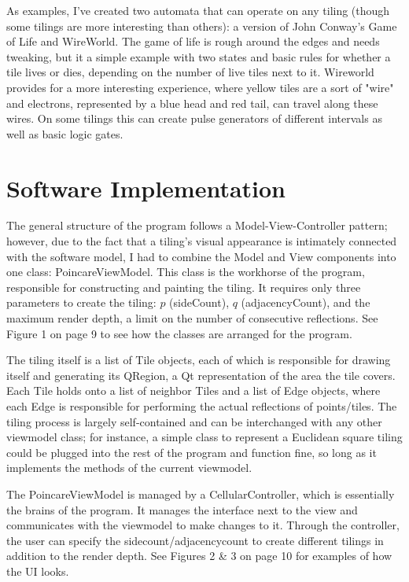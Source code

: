 \documentclass[letterpaper,12pt]{article}
\begin{document}
As examples, I've created two automata that can operate on any tiling (though some tilings are more interesting than others): a version of John Conway's Game of Life and WireWorld. The game of life is rough around the edges and needs tweaking, but it a simple example with two states and basic rules for whether a tile lives or dies, depending on the number of live tiles next to it. Wireworld provides for a more interesting experience, where yellow tiles are a sort of "wire" and electrons, represented by a blue head and red tail, can travel along these wires. On some tilings this can create pulse generators of different intervals as well as basic logic gates.


\section*{Software Implementation}

The general structure of the program follows a Model-View-Controller pattern; however, due to the fact that a tiling's visual appearance is intimately connected with the software model, I had to combine the Model and View components into one class: PoincareViewModel. This class is the workhorse of the program, responsible for constructing and painting the tiling. It requires only three parameters to create the tiling: $p$ (sideCount), $q$ (adjacencyCount), and the maximum render depth, a limit on the number of consecutive reflections. See Figure 1 on page 9 to see how the classes are arranged for the program.

The tiling itself is a list of Tile objects, each of which is responsible for drawing itself and generating its QRegion, a Qt representation of the area the tile covers. Each Tile holds onto a list of neighbor Tiles and a list of Edge objects, where each Edge is responsible for performing the actual reflections of points/tiles. The tiling process is largely self-contained and can be interchanged with any other viewmodel class; for instance, a simple class to represent a Euclidean square tiling could be plugged into the rest of the program and function fine, so long as it implements the methods of the current viewmodel.

The PoincareViewModel is managed by a CellularController, which is essentially the brains of the program. It manages the interface next to the view and communicates with the viewmodel to make changes to it. Through the controller, the user can specify the sidecount/adjacencycount to create different tilings in addition to the render depth. See Figures 2 \& 3 on page 10 for examples of how the UI looks.
\end{document}

